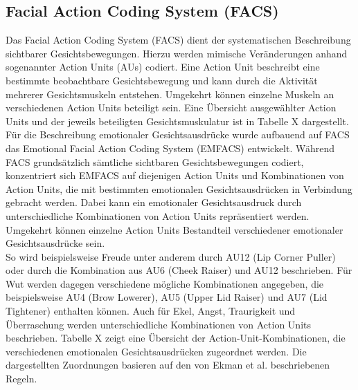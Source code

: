 \documentclass[intern]{cgMA}
\begin{document}
\subsection{Facial Action Coding System (FACS)}
Das Facial Action Coding System (FACS) dient der systematischen Beschreibung sichtbarer Gesichtsbewegungen. Hierzu werden mimische Veränderungen anhand sogenannter Action Units (AUs) codiert. Eine Action Unit beschreibt eine bestimmte beobachtbare Gesichtsbewegung und kann durch die Aktivität mehrerer Gesichtsmuskeln entstehen. Umgekehrt können einzelne Muskeln an verschiedenen Action Units beteiligt sein. Eine Übersicht ausgewählter Action Units und der jeweils beteiligten Gesichtsmuskulatur ist in Tabelle X dargestellt.\\
Für die Beschreibung emotionaler Gesichtsausdrücke wurde aufbauend auf FACS das Emotional Facial Action Coding System (EMFACS) entwickelt. Während FACS grundsätzlich sämtliche sichtbaren Gesichtsbewegungen codiert, konzentriert sich EMFACS auf diejenigen Action Units und Kombinationen von Action Units, die mit bestimmten emotionalen Gesichtsausdrücken in Verbindung gebracht werden.\cite{facsStimuli} Dabei kann ein emotionaler Gesichtsausdruck durch unterschiedliche Kombinationen von Action Units repräsentiert werden. Umgekehrt können einzelne Action Units Bestandteil verschiedener emotionaler Gesichtsausdrücke sein.\cite{turrisi2026blendshape}\cite{facialActionCodingReview}\\
So wird beispielsweise Freude unter anderem durch AU12 (Lip Corner Puller) oder durch die Kombination aus AU6 (Cheek Raiser) und AU12 beschrieben. Für Wut werden dagegen verschiedene mögliche Kombinationen angegeben, die beispielsweise AU4 (Brow Lowerer), AU5 (Upper Lid Raiser) und AU7 (Lid Tightener) enthalten können. Auch für Ekel, Angst, Traurigkeit und Überraschung werden unterschiedliche Kombinationen von Action Units beschrieben. Tabelle X zeigt eine Übersicht der Action-Unit-Kombinationen, die verschiedenen emotionalen Gesichtsausdrücken zugeordnet werden. Die dargestellten Zuordnungen basieren auf den von Ekman et al. beschriebenen Regeln. \cite{facsStimuli}\\
\end{document}
